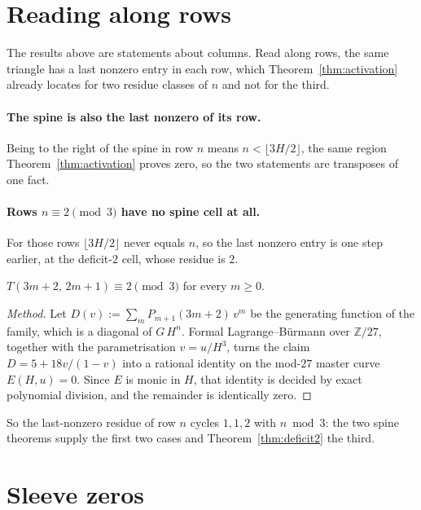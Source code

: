 \documentclass[11pt]{article}
\newcommand{\Z}{\mathbb{Z}}
\begin{document}
\section{Reading along rows}

The results above are statements about columns. Read along rows, the same
triangle has a last nonzero entry in each row, which
Theorem~\ref{thm:activation} already locates for two residue classes of $n$
and not for the third.

\paragraph{The spine is also the last nonzero of its row.} Being to the right of
the spine in row $n$ means $n < \lfloor 3H/2\rfloor$, the same region
Theorem~\ref{thm:activation} proves zero, so the two statements are transposes
of one fact.

\paragraph{Rows $n \equiv 2 \pmod 3$ have no spine cell at all.} For those rows
$\lfloor 3H/2\rfloor$ never equals $n$, so the last nonzero entry is one step
earlier, at the deficit-$2$ cell, whose residue is $2$.

\begin{theorem}
\label{thm:deficit2}
$T(3m+2,\,2m+1) \equiv 2 \pmod 3$ for every $m \ge 0$.
\end{theorem}

\begin{proof}[Method]
Let $D(v) := \sum_m P_{m+1}(3m+2)\,v^m$ be the generating function of the
family, which is a diagonal of $G\,H^n$. Formal Lagrange--B\"urmann over
$\Z/27$, together with the parametrisation $v = u/H^3$, turns the claim
$D = 5 + 18v/(1-v)$ into a rational identity on the mod-$27$ master curve
$E(H,u) = 0$. Since $E$ is monic in $H$, that identity is decided by exact
polynomial division, and the remainder is identically zero.
\end{proof}

So the last-nonzero residue of row $n$ cycles $1, 1, 2$ with $n \bmod 3$: the two
spine theorems supply the first two cases and Theorem~\ref{thm:deficit2} the
third.

\section{Sleeve zeros}
\label{sec:sleeve}
\end{document}
